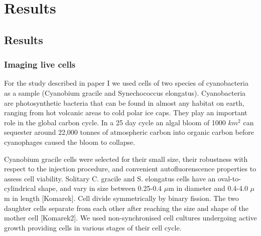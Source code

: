 \part{Results}
\chapter{Results}
\section{Imaging live cells}
For the study described in paper I we used cells of two species of cyanobacteria as a sample (Cyanobium gracile and Synechococcus elongatus). Cyanobacteria are photosynthetic bacteria that can be found in almost any habitat on earth, ranging from hot volcanic areas to cold polar ice caps. They play an important role in the global carbon cycle. In a 25 day cycle an algal bloom of 1000 $km^2$ can sequester around 22,000 tonnes of atmospheric carbon into organic carbon before cyanophages caused the bloom to collapse.
 
Cyanobium gracile cells were selected for their small size, their robustness with respect to the injection procedure, and convenient autofluorenscence properties to assess cell viability. Solitary C. gracile and S. elongatus cells have an oval-to-cylindrical shape, and vary in size between 0.25-0.4 $\mu$m in diameter and 0.4-4.0 $\mu$m in length [Komarek]. Cell divide symmetrically by binary fission. The two daughter cells separate from each other after reaching the size and shape of the mother cell [Komarek2]. We used non-synchronised cell cultures undergoing active growth providing cells in various stages of their cell cycle. 

